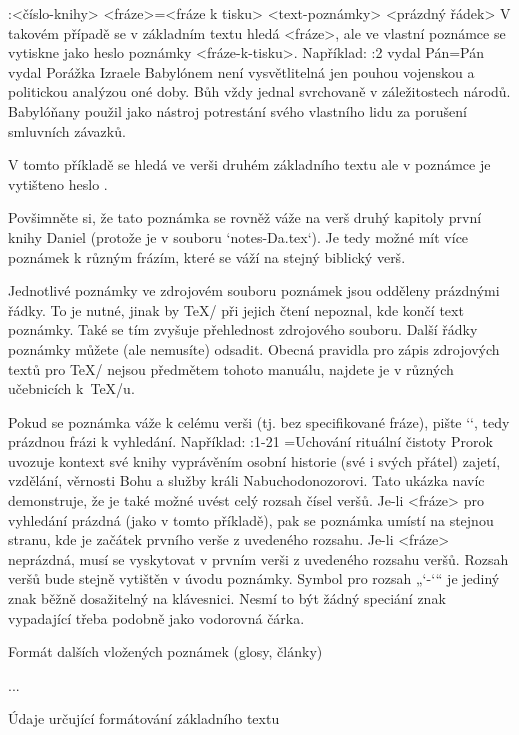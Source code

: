 \begtt
{}:<číslo-knihy> {<fráze>}={<fráze k tisku>} <text-poznámky> 
<prázdný řádek>
\endtt
V takovém případě se v základním textu hledá <fráze>, ale ve vlastní
poznámce se vytiskne jako heslo poznámky <fráze-k-tisku>. Například:
\begtt
{}:2 {vydal Pán}={Pán vydal} Porážka Izraele Babylónem není vysvětlitelná
   jen pouhou vojenskou a politickou analýzou oné doby. Bůh vždy jednal svrchovaně 
   v záležitostech národů. Babylóňany použil jako nástroj potrestání svého vlastního
   lidu za porušení smluvních závazků.

\endtt
V tomto příkladě se hledá ve verši druhém základního textu  
ale v poznámce je vytišteno heslo .

Povšimněte si, že tato poznámka se rovněž váže na verš druhý kapitoly první
knihy Daniel (protože je v souboru `notes-Da.tex`). Je tedy možné mít více
poznámek k různým frázím, které se váží na stejný biblický verš. 

Jednotlivé poznámky ve zdrojovém souboru poznámek jsou odděleny prázdnými
řádky. To je nutné, jinak by \TeX/ při jejich čtení nepoznal, kde končí text
poznámky. Také se tím zvyšuje přehlednost zdrojového souboru. Další řádky
poznámky můžete (ale nemusíte) odsadit. Obecná pravidla pro zápis
zdrojových textů pro \TeX/ nejsou předmětem tohoto manuálu, najdete je v
různých učebnicích k~\TeX/u.

Pokud se poznámka váže k celému verši (tj. bez specifikované fráze), pište
`{}`, tedy prázdnou frázi k vyhledání. Například:
\begtt
{}:1-21 {}={Uchování rituální čistoty}  Prorok uvozuje kontext své knihy vyprávěním
   osobní historie (své i svých přátel) zajetí, vzdělání, věrnosti Bohu a služby 
   králi Nabuchodonozorovi.
\endtt
Tato ukázka navíc demonstruje, že je také možné uvést celý rozsah čísel veršů.
Je-li <fráze> pro vyhledání prázdná (jako v tomto příkladě), pak se poznámka
umístí na stejnou stranu, kde je začátek prvního verše z uvedeného rozsahu.
Je-li <fráze> neprázdná, musí se vyskytovat v prvním verši z uvedeného
rozsahu veršů. Rozsah veršů bude stejně vytištěn v úvodu poznámky.
Symbol pro rozsah „`-`“ je jediný znak  běžně dosažitelný na
klávesnici. Nesmí to být žádný speciání znak vypadající třeba podobně jako
vodorovná čárka.



\sec[glosy] Formát dalších vložených poznámek (glosy, články)

\TODO...

\sec[fmt] Údaje určující formátování základního textu

